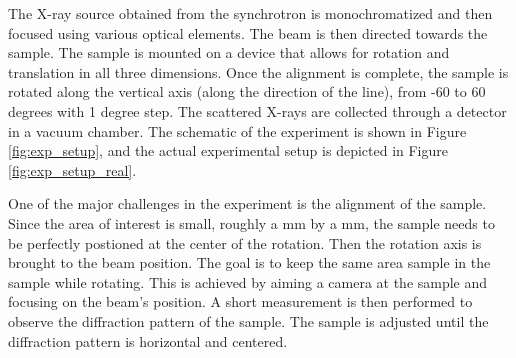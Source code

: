 The X-ray source obtained from the synchrotron is monochromatized and then focused using
various optical elements. The beam is then directed towards the sample. The 
sample is mounted on a device that allows for rotation and translation in all 
three dimensions. Once the alignment is complete, the sample is rotated along the vertical axis (along the direction of the line), from -60
to 60 degrees with 1 degree step. The scattered X-rays are collected through a detector in a 
vacuum chamber. The schematic of the experiment is shown in Figure \ref{fig:exp_setup},
and the actual experimental setup is depicted in Figure \ref{fig:exp_setup_real}.

\medskip

One of the major challenges in the experiment is the alignment of the sample. Since the area of interest is small, roughly a mm by a mm,
the sample needs to be perfectly postioned at the center of the rotation. Then the rotation axis is brought to the beam position. 
The goal is to keep the same area sample in the sample while rotating. This is achieved by 
aiming a camera at the sample and focusing on the beam's position. A short  measurement is then performed to observe the diffraction pattern of the sample.
The sample is adjusted until the diffraction pattern is horizontal and centered.

